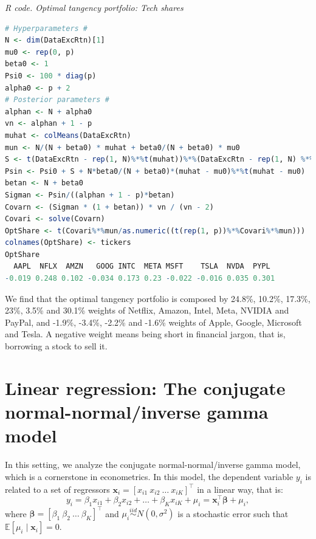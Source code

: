 \begin{enumerate}
\begin{tcolorbox}[enhanced,width=4.67in,center upper,
	fontupper=\large\bfseries,drop shadow southwest,sharp corners]
	\textit{R code. Optimal tangency portfolio: Tech shares}
\begin{VF}
\begin{lstlisting}[language=R]
# Hyperparameters #
N <- dim(DataExcRtn)[1]
mu0 <- rep(0, p)
beta0 <- 1
Psi0 <- 100 * diag(p)
alpha0 <- p + 2
# Posterior parameters #
alphan <- N + alpha0
vn <- alphan + 1 - p
muhat <- colMeans(DataExcRtn)
mun <- N/(N + beta0) * muhat + beta0/(N + beta0) * mu0
S <- t(DataExcRtn - rep(1, N)%*%t(muhat))%*%(DataExcRtn - rep(1, N) %*%t(muhat)) 
Psin <- Psi0 + S + N*beta0/(N + beta0)*(muhat - mu0)%*%t(muhat - mu0)
betan <- N + beta0
Sigman <- Psin/((alphan + 1 - p)*betan)
Covarn <- (Sigman * (1 + betan)) * vn / (vn - 2)
Covari <- solve(Covarn)
OptShare <- t(Covari%*%mun/as.numeric((t(rep(1, p))%*%Covari%*%mun)))
colnames(OptShare) <- tickers
OptShare
  AAPL  NFLX  AMZN   GOOG INTC  META MSFT    TSLA  NVDA  PYPL
-0.019 0.248 0.102 -0.034 0.173 0.23 -0.022 -0.016 0.035 0.301
\end{lstlisting}
\end{VF}
\end{tcolorbox}

We find that the optimal tangency portfolio is composed by 24.8\%, 10.2\%, 17.3\%, 23\%, 3.5\% and 30.1\% weights of Netflix, Amazon, Intel, Meta, NVIDIA and PayPal, and -1.9\%, -3.4\%, -2.2\% and -1.6\% weights of Apple, Google, Microsoft and Tesla. A negative weight means being short in financial jargon, that is, borrowing a stock to sell it.
\end{enumerate}

\section{Linear regression: The conjugate normal-normal/inverse gamma model}\label{sec43}

In this setting, we analyze the conjugate normal-normal/inverse gamma model, which is a cornerstone in econometrics. In this model, the dependent variable \( y_i \) is related to a set of regressors \( \bm{x}_i = [x_{i1} \ x_{i2} \ \dots \ x_{iK}]^{\top} \) in a linear way, that is:
\[
y_i = \beta_1 x_{i1} + \beta_2 x_{i2} + \dots + \beta_K x_{iK} + \mu_i = \bm{x}_i^{\top} \bm{\beta} + \mu_i,
\]
where \( \bm{\beta} = [\beta_1 \ \beta_2 \ \dots \ \beta_K]^{\top} \) and \( \mu_i \stackrel{iid}{\sim} N(0, \sigma^2) \) is a stochastic error such that \( \mathbb{E}[\mu_i \mid \bm{x}_i] = 0 \).

